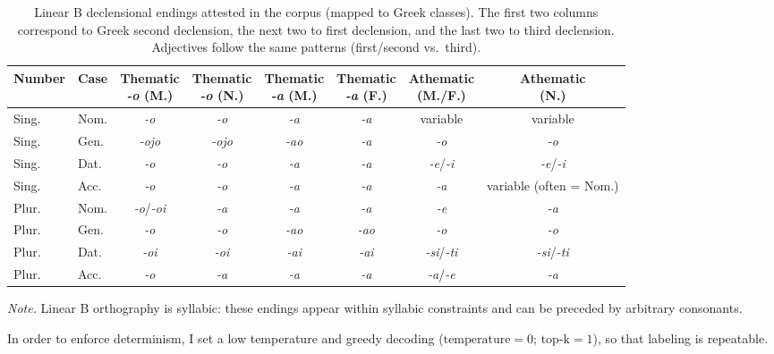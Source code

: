 \begin{table}[h!]
\centering
\caption{Linear B declensional endings attested in the corpus (mapped to Greek classes). The first two columns correspond to Greek second declension, the next two to first declension, and the last two to third declension. Adjectives follow the same patterns (first/second vs.\ third).}
\label{table:declension-table}
\renewcommand{\arraystretch}{1.15}
\begin{adjustbox}{center,max width=\textwidth}
\begin{tabular}{|l|l|c|c|c|c|c|c|}
\hline
\textbf{Number} & \textbf{Case}
& \shortstack{\textbf{Thematic}\\\textbf{\textit{-o} (M.)}}
& \shortstack{\textbf{Thematic}\\\textbf{\textit{-o} (N.)}}
& \shortstack{\textbf{Thematic}\\\textbf{\textit{-a} (M.)}}
& \shortstack{\textbf{Thematic}\\\textbf{\textit{-a} (F.)}}
& \shortstack{\textbf{Athematic}\\\textbf{(M./F.)}}
& \shortstack{\textbf{Athematic}\\\textbf{(N.)}} \\
\hline
Sing. & Nom. & \textit{-o} & \textit{-o} & \textit{-a} & \textit{-a} & variable & variable \\
Sing. & Gen. & \textit{-ojo} & \textit{-ojo} & \textit{-ao} & \textit{-a} & \textit{-o} & \textit{-o} \\
Sing. & Dat. & \textit{-o} & \textit{-o} & \textit{-a} & \textit{-a} & \textit{-e}/\textit{-i} & \textit{-e}/\textit{-i} \\
Sing. & Acc. & \textit{-o} & \textit{-o} & \textit{-a} & \textit{-a} & \textit{-a} & variable (often = Nom.) \\
\hline
Plur. & Nom. & \textit{-o}/\textit{-oi} & \textit{-a} & \textit{-a} & \textit{-a} & \textit{-e} & \textit{-a} \\
Plur. & Gen. & \textit{-o} & \textit{-o} & \textit{-ao} & \textit{-ao} & \textit{-o} & \textit{-o} \\
Plur. & Dat. & \textit{-oi} & \textit{-oi} & \textit{-ai} & \textit{-ai} & \textit{-si}/\textit{-ti} & \textit{-si}/\textit{-ti} \\
Plur. & Acc. & \textit{-o} & \textit{-a} & \textit{-a} & \textit{-a} & \textit{-a}/\textit{-e} & \textit{-a} \\
\hline
\end{tabular}
\end{adjustbox}

\small\emph{Note.} Linear B orthography is syllabic: these endings appear within syllabic constraints and can be preceded by arbitrary consonants.
\end{table}
In order to enforce determinism, I set a low temperature and greedy decoding ($\text{temperature}= 0$; $\text{top-k}= 1$), so that labeling is repeatable.

